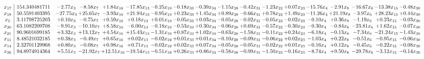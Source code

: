 \documentclass[9pt]{article}
\begin{document}
 \[\begin{array}{c| c c@{\hskip 2pt} c@{\hskip 2pt} c@{\hskip 2pt} c@{\hskip 2pt} c@{\hskip 2pt} c@{\hskip 2pt} c@{\hskip 2pt} c@{\hskip 2pt} c@{\hskip 2pt} c@{\hskip 2pt} c@{\hskip 2pt} c@{\hskip 2pt} c@{\hskip 2pt} c@{\hskip 2pt} c@{\hskip 2pt} c@{\hskip 2pt} }
 x_{17}   &  154.340481711 & -2.77 x_{3} & -8.58 x_{7} & +  1.84 x_{16} & -17.85 x_{13} & -0.25 x_{19} & -0.18 x_{33} & -0.39 x_{34} & -1.15 x_{28} & -0.42 x_{31} & -1.23 x_{22} & +  0.07 x_{23} & -15.76 x_{4} & -2.91 x_{8} & -16.67 x_{6} & -13.38 x_{15} & -0.48 x_{30}\\
 x_{18}   &  50.5591403395 & -27.75 x_{3} & + 25.65 x_{7} & -3.93 x_{16} & + 21.94 x_{13} & -0.95 x_{19} & +  0.23 x_{33} & +  1.45 x_{34} & +  0.89 x_{28} & -0.66 x_{31} & +  0.78 x_{22} & +  1.49 x_{23} & -11.26 x_{4} & + 21.19 x_{8} & -3.97 x_{6} & + 28.23 x_{15} & +  0.44 x_{30}\\
 x_{5}   &  3.11798725203 & +  0.10 x_{3} & -0.75 x_{7} & +  0.59 x_{16} & +  0.18 x_{13} & +  0.01 x_{19} & -0.05 x_{33} & +  0.03 x_{34} & -0.05 x_{28} & -0.02 x_{31} & -0.05 x_{22} & -0.02 x_{23} & -0.10 x_{4} & +  0.36 x_{8} & -1.19 x_{6} & +  0.23 x_{15} & -0.03 x_{30}\\
 x_{20}   &  63.1082209708 & -9.91 x_{3} & -10.10 x_{7} & +  8.58 x_{16} & -6.00 x_{13} & -0.18 x_{19} & -0.53 x_{33} & +  0.30 x_{34} & -0.06 x_{28} & +  0.69 x_{31} & -0.57 x_{22} & -0.30 x_{23} & -0.30 x_{4} & -0.84 x_{8} & -23.81 x_{6} & +  1.62 x_{15} & -0.07 x_{30}\\
 x_{21}   &  90.9601699185 & +  3.32 x_{3} & + 13.12 x_{7} & +  4.54 x_{16} & + 15.43 x_{13} & -1.31 x_{19} & +  0.87 x_{33} & +  1.02 x_{34} & -0.63 x_{28} & -1.58 x_{31} & -0.11 x_{22} & +  0.24 x_{23} & -6.18 x_{4} & -0.13 x_{8} & -7.34 x_{6} & -21.24 x_{15} & -1.43 x_{30}\\
 x_{11}   &  8.48521032185 & +  0.38 x_{3} & -0.49 x_{7} & +  0.65 x_{16} & +  0.02 x_{13} & -0.02 x_{19} & +  0.01 x_{33} & +  0.01 x_{34} & -0.10 x_{28} & -0.09 x_{31} & -0.06 x_{22} & +  0.02 x_{23} & -1.03 x_{4} & +  0.22 x_{8} & -0.51 x_{6} & -0.95 x_{15} & -0.06 x_{30}\\
 x_{14}   &  2.32701129968 & +  0.80 x_{3} & -0.08 x_{7} & +  0.98 x_{16} & +  0.71 x_{13} & -0.02 x_{19} & +  0.02 x_{33} & +  0.07 x_{34} & -0.05 x_{28} & -0.05 x_{31} & -0.02 x_{22} & +  0.01 x_{23} & -0.16 x_{4} & +  0.12 x_{8} & -0.45 x_{6} & -0.22 x_{15} & -0.08 x_{30}\\
 x_{26}   &  94.8974914364 & +  5.51 x_{3} & -21.92 x_{7} & + 12.51 x_{16} & -19.54 x_{13} & -0.51 x_{19} & +  0.26 x_{33} & +  0.86 x_{34} & -0.58 x_{28} & -0.09 x_{31} & -1.50 x_{22} & -0.16 x_{23} & -8.74 x_{4} & +  9.50 x_{8} & -29.78 x_{6} & -3.12 x_{15} & -0.14 x_{30}\\

\end{array}\]
\end{document}
